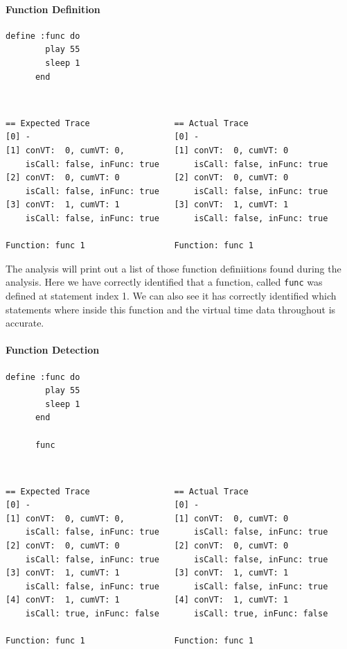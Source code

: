 \documentclass[11pt, abstracton, twoside, titlepage=true]{scrartcl}
\begin{document}
\paragraph{Function Definition}
\begin{minipage}{\textwidth}
	\begin{lstlisting}[style = sonicpi]
      define :func do
        play 55
        sleep 1
      end
	\end{lstlisting}
\end{minipage}
\\
\begin{lstlisting}
== Expected Trace                 == Actual Trace
[0] -                             [0] -
[1] conVT:  0, cumVT: 0,          [1] conVT:  0, cumVT: 0
    isCall: false, inFunc: true       isCall: false, inFunc: true            
[2] conVT:  0, cumVT: 0           [2] conVT:  0, cumVT: 0
    isCall: false, inFunc: true       isCall: false, inFunc: true 
[3] conVT:  1, cumVT: 1           [3] conVT:  1, cumVT: 1
    isCall: false, inFunc: true       isCall: false, inFunc: true 

Function: func 1                  Function: func 1
\end{lstlisting}

The analysis will print out a list of those function definiitions found during 
the analysis. Here we have correctly identified that a function, called 
\texttt{func} was defined at statement index 1. We can also see it has correctly 
identified which statements where inside this function and the virtual time data 
throughout is accurate.

\paragraph{Function Detection}
\begin{minipage}{\textwidth}
	\begin{lstlisting}[style = sonicpi]
      define :func do
        play 55
        sleep 1
      end

      func
	\end{lstlisting}
\end{minipage}
\\
\begin{lstlisting}
== Expected Trace                 == Actual Trace
[0] -                             [0] -
[1] conVT:  0, cumVT: 0,          [1] conVT:  0, cumVT: 0
    isCall: false, inFunc: true       isCall: false, inFunc: true            
[2] conVT:  0, cumVT: 0           [2] conVT:  0, cumVT: 0
    isCall: false, inFunc: true       isCall: false, inFunc: true 
[3] conVT:  1, cumVT: 1           [3] conVT:  1, cumVT: 1
    isCall: false, inFunc: true       isCall: false, inFunc: true 
[4] conVT:  1, cumVT: 1           [4] conVT:  1, cumVT: 1
    isCall: true, inFunc: false       isCall: true, inFunc: false 

Function: func 1                  Function: func 1
\end{lstlisting}
\end{document}
